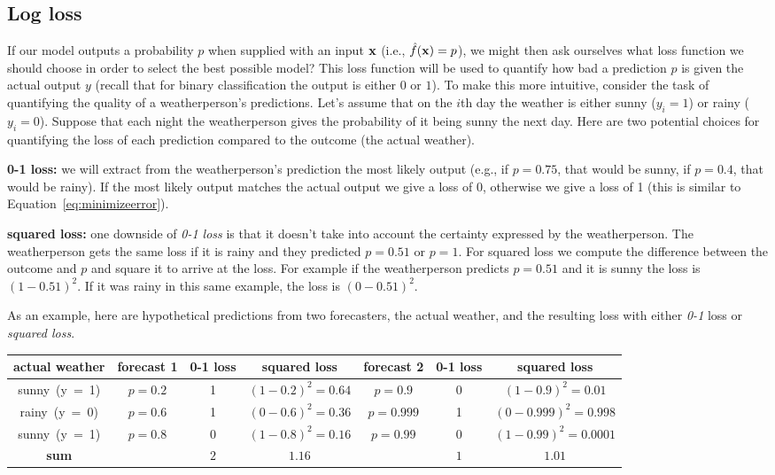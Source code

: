 \documentclass[assignment03_Solutions]{subfiles}
\begin{document}
\subsection{Log loss}
If our model outputs a probability $p$ when supplied with an input $\mathbf{x}$ (i.e., $\hat{f}(\mathbf{x}) = p$), we might then ask ourselves what loss function we should choose in order to select the best possible model?  This loss function will be used to quantify how bad a prediction $p$ is given the actual output $y$ (recall that for binary classification the output is either $0$ or $1$).  To make this more intuitive, consider the task of quantifying the quality of a weatherperson's predictions.  Let's assume that on the $i$th day the weather is either sunny ($y_i = 1$) or rainy ($y_i = 0$).  Suppose that each night the weatherperson gives the probability of it being sunny the next day.  Here are two potential choices for quantifying the loss of each prediction compared to the outcome (the actual weather).
\be
\item \textbf{0-1 loss:} we will extract from the weatherperson's prediction the most likely output (e.g., if $p = 0.75$, that would be sunny, if $p = 0.4$, that would be rainy).  If the most likely output matches the actual output we give a loss of 0, otherwise we give a loss of 1 (this is similar to Equation~\ref{eq:minimizeerror}).
\item \textbf{squared loss:} one downside of \emph{0-1 loss} is that it doesn't take into account the certainty expressed by the weatherperson.  The weatherperson gets the same loss if it is rainy and they predicted $p = 0.51$ or $p = 1$.  For squared loss we compute the difference between the outcome and $p$ and square it to arrive at the loss.  For example if the weatherperson predicts $p = 0.51$ and it is sunny the loss is $(1 - 0.51)^2$.  If it was rainy in this same example, the loss is $(0 - 0.51)^2$.
\ee

As an example, here are hypothetical predictions from two forecasters, the actual weather, and the resulting loss with either \emph{0-1} loss or \emph{squared loss}.


\begin{table}
\centering
\begin{tabular}{c | c | c | c | c | c | c}
\hline
actual weather & forecast 1 & 0-1 loss & squared loss & forecast 2 & 0-1 loss & squared loss \\
\hline
\mbox{sunny (y = 1)} & $p = 0.2$ & 1 & $(1-0.2)^2 = 0.64$ & $p = 0.9$ & 0 & $(1 - 0.9)^2 = 0.01$\\
\mbox{rainy (y = 0)} & $p = 0.6$  & 1 & $(0-0.6)^2 = 0.36$ & $p = 0.999$ & 1 & $(0 - 0.999)^2 = 0.998$ \\ 
\mbox{sunny (y = 1)} & $p = 0.8$ & 0 & $(1-0.8)^2 = 0.16$ & $p = 0.99$ & 0 & $(1 - 0.99)^2 = 0.0001$\\
\hline
\textbf{sum} & & $2$ & $1.16$ & & $1$ & $1.01$
\end{tabular}
\end{table}
\end{document}
